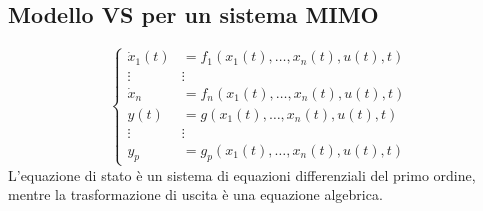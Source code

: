 \documentclass{book}
\begin{document}
  \subsection{Modello VS per un sistema MIMO}
  \begin{equation*}
    \begin{cases}
      \dot{x}_1(t) & = f_1(x_1(t),\dots,x_n(t),u(t),t)\\
      \vdots & \vdots\\
      \dot{x}_n & = f_n(x_1(t),\dots,x_n(t),u(t),t)\\
      y(t) & = g(x_1(t),\dots, x_n(t),u(t),t)\\
      \vdots & \vdots\\
      y_p & = g_p(x_1(t),\dots,x_n(t),u(t),t)
    \end{cases}
  \end{equation*}
  L'equazione di stato è un {\color{red}sistema di equazioni differenziali del primo ordine}, mentre la
  trasformazione di uscita è una {\color{blue}equazione algebrica}.
  \clearpage
\end{document}
